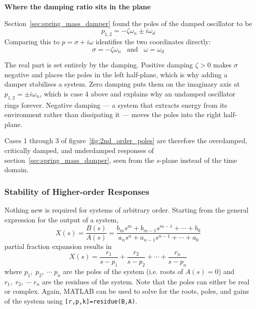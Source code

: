 \documentclass[12pt,letter]{article}
\begin{document}
\begin{review}
	\label{sec:damping_ratio_and_poles}
	\textbf{Where the damping ratio sits in the plane}

	Section~\ref{sec:spring_mass_damper} found the poles of the damped oscillator to be
	\begin{equation}
		p_{1,2} = -\zeta \omega_n \pm i \omega_d
	\end{equation}
	Comparing this to $p = \sigma + i\omega$ identifies the two coordinates directly:
	\begin{equation}
		\sigma = -\zeta \omega_n \; \; \; \text{and} \; \; \; \omega = \omega_d
	\end{equation}

	The real part is set entirely by the damping. Positive damping $\zeta > 0$ makes $\sigma$ negative and places the poles in the left half-plane, which is why adding a damper stabilises a system. Zero damping puts them on the imaginary axis at $p_{1,2} = \pm i\omega_n$, which is case 4 above and explains why an undamped oscillator rings forever. Negative damping --- a system that extracts energy from its environment rather than dissipating it --- moves the poles into the right half-plane.

	Cases 1 through 3 of figure~\ref{fig:2nd_order_poles} are therefore the overdamped, critically damped, and underdamped responses of section~\ref{sec:spring_mass_damper}, seen from the $s$-plane instead of the time domain.
\end{review}

\subsubsection{Stability of Higher-order Responses}
\label{sec:stability_higher_order}

Nothing new is required for systems of arbitrary order. Starting from the general expression for the output of a system,
\begin{equation}
	X(s) = \frac{B(s)}{A(s)} = \frac{b_ms^m+b_{m-1}s^{m-1} + \cdots + b_0}{a_ns^n+a_{n-1}s^{n-1} + \cdots + a_0}
\end{equation}
partial fraction expansion results in
\begin{equation}
	X(s) = \frac{r_1}{s-p_1} + \frac{r_2}{s-p_2} + \cdots + \frac{r_n}{s-p_n}
\end{equation}
where $p_1, \; p_2, \; \cdots \; p_n$ are the poles of the system (i.e. roots of $A(s)=0$) and $r_1,\; r_2,\; \cdots \; r_n$ are the residues of the system. Note that the poles can either be real or complex. Again, MATLAB can be used to solve for the roots, poles, and gains of the system using \texttt{[r,p,k]=residue(B,A)}.
\end{document}
